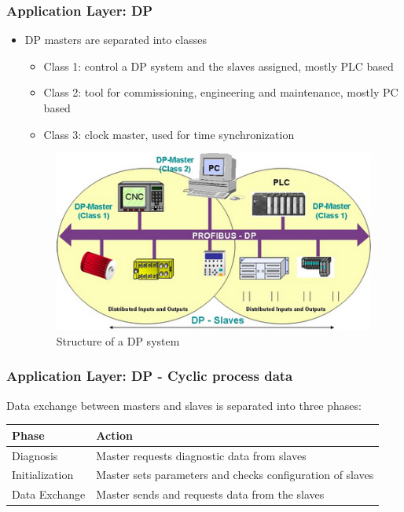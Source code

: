 \documentclass{beamer}
\begin{document}
\begin{frame}
  \frametitle{Application Layer: DP}
  \begin{itemize}
    \item DP masters are separated into classes
      \begin{itemize}
        \item Class 1: control a DP system and the slaves assigned, mostly PLC based
        \item Class 2: tool for commissioning, engineering and maintenance, mostly PC
          based
        \item Class 3: clock master, used for time synchronization
      \end{itemize}
      \center
      \begin{figure}
        \includegraphics[width=.50\textwidth]{img/dp_system.png}
        \caption{Structure of a DP system~\cite{profibusmanual}}
      \end{figure}
  \end{itemize}
\end{frame}

\begin{frame}
  \frametitle{Application Layer: DP - Cyclic process data}
  Data exchange between masters and slaves is separated into three
  phases:~\cite{profibusmanual}
  \center
  \footnotesize
  \begin{tabular}[h]{l|l}
    \textbf{Phase}  & \textbf{Action} \\
    \hline
    Diagnosis       & Master requests diagnostic data from slaves \\
    Initialization  & Master sets parameters and checks configuration of slaves \\
    Data Exchange   & Master sends and requests data from the slaves
  \end{tabular} \\
\end{frame}
\end{document}
